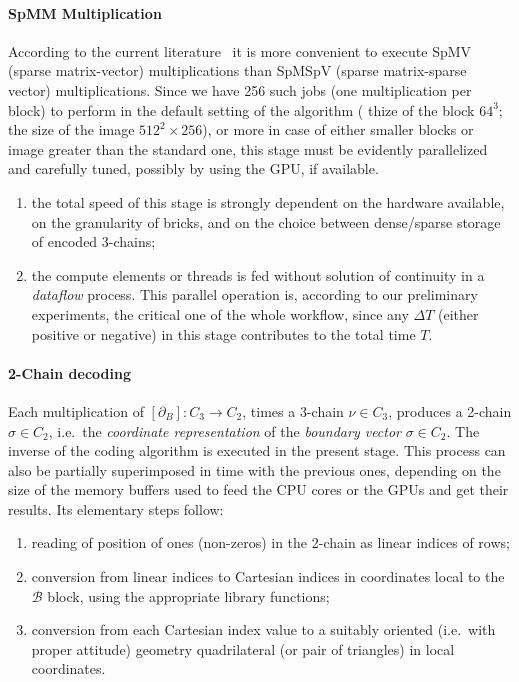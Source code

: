 \paragraph{SpMM Multiplication}\label{SpMM-multiplication}
According to the current literature~
\cite{Buluc2017} it is more convenient to execute SpMV (sparse matrix-vector) multiplications than SpMSpV (sparse matrix-sparse vector) multiplications. Since we have 256 such jobs (one multiplication per block) to perform in the default setting of the algorithm (
thize of the block $64^3$; the size of the image $512^2\times 256$), or more in case of either smaller blocks or image greater than the standard one, this stage must be evidently parallelized and carefully tuned, possibly by using the GPU, if available.
\begin{enumerate}

\item the total speed of this stage is strongly dependent on the hardware available, on the granularity of bricks, and on the choice between dense/sparse storage of encoded 3-chains;

\item the compute elements or threads is fed without solution of continuity in a \emph{dataflow} process. This parallel operation is, according to our preliminary experiments, the critical one of the whole workflow, since any $\Delta T$ (either positive or negative) in this stage contributes to the total time $T$.

\end{enumerate}

\paragraph{2-Chain decoding}\label{sec:two-chain-decoding}
Each multiplication of $[\partial_B] : C_3 \to C_2$, times a 3-chain $\nu\in C_3$, produces a 2-chain  $\sigma\in C_2$, i.e.~the \emph{coordinate representation} of the \emph{boundary vector} $\sigma\in C_2$.  The inverse of the coding algorithm is executed in the present stage.  This process can also be partially superimposed in time with the previous ones, depending on the size of the memory buffers used to feed the CPU cores or the GPUs and get their results. Its elementary steps follow:

\begin{enumerate}

\item reading of position of ones (non-zeros) in the 2-chain as linear indices of rows;

\item conversion from linear indices to Cartesian indices in coordinates local to the $\mathcal{B}$ block, using the appropriate library functions;

\item conversion from each Cartesian index value to a suitably oriented (i.e.~with proper attitude) geometry quadrilateral (or pair of triangles) in local coordinates.

\end{enumerate}

